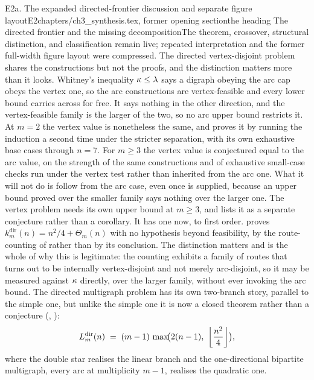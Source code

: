 \begin{offcut}{E2a. The expanded directed-frontier discussion and separate figure layout}{E2}{chapters/ch3\_synthesis.tex, former opening section}{the heading The directed frontier and the missing decomposition}{The theorem, crossover, structural distinction, and classification remain live; repeated interpretation and the former full-width figure layout were compressed.}
The directed vertex-disjoint problem shares the constructions but not the proofs, and the distinction matters more than it looks. Whitney's inequality $\kappa \le \lambda$ says a digraph obeying the arc cap obeys the vertex one, so the arc constructions are vertex-feasible and every lower bound carries across for free. It says nothing in the other direction, and the vertex-feasible family is the larger of the two, so no arc upper bound restricts it. At $m = 2$ the vertex value is nonetheless the same, and  proves it by running the induction a second time under the stricter separation, with its own exhaustive base cases through $n = 7$. For $m \ge 3$ the vertex value is conjectured equal to the arc value, on the strength of the same constructions and of exhaustive small-case checks run under the vertex test rather than inherited from the arc one. What it will not do is follow from the arc case, even once  is supplied, because an upper bound proved over the smaller family says nothing over the larger one. The vertex problem needs its own upper bound at $m \ge 3$, and  lists it as a separate conjecture rather than a corollary. It has one now, to first order.  proves $k_m^{\mathrm{dir}}(n) = n^2/4 + \Theta_m(n)$ with no hypothesis beyond feasibility, by the route-counting of  rather than by its conclusion. The distinction matters and is the whole of why this is legitimate: the counting exhibits a family of routes that turns out to be internally vertex-disjoint and not merely arc-disjoint, so it may be measured against $\kappa$ directly, over the larger family, without ever invoking the arc bound. The directed multigraph problem has its own two-branch story, parallel to the simple one, but unlike the simple one it is now a closed theorem rather than a conjecture (, ):
\[
L_m^{\mathrm{dir}}(n) \;=\; (m-1)\,\max\!\bigl(2(n-1),\ \left\lfloor \frac{n^2}{4} \right\rfloor\bigr),
\]
where the double star realises the linear branch and the one-directional bipartite multigraph, every arc at multiplicity $m-1$, realises the quadratic one.


\end{offcut}
